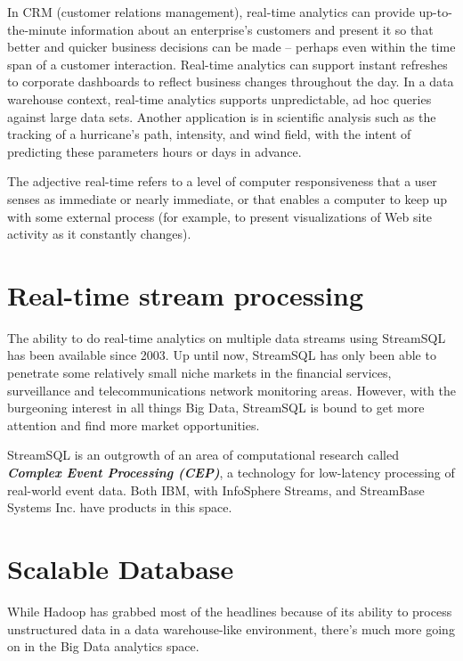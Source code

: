 \documentclass[11pt]{article} %
\begin{document}
In CRM (customer relations management), real-time analytics can provide up-to-the-minute information about an enterprise's customers and present it so that better and quicker business decisions can be made -- perhaps even within the time span of a customer interaction. Real-time analytics can support instant refreshes to corporate dashboards to reflect business changes throughout the day. In a data warehouse context, real-time analytics supports unpredictable, ad hoc queries against large data sets. Another application is in scientific analysis such as the tracking of a hurricane's path, intensity, and wind field, with the intent of predicting these parameters hours or days in advance.


The adjective real-time refers to a level of computer responsiveness that a user senses as immediate or nearly immediate, or that enables a computer to keep up with some external process (for example, to present visualizations of Web site activity as it constantly changes).



\section{Real-time stream processing}


The ability to do real-time analytics on multiple data streams using StreamSQL has been available since 2003. Up until now, StreamSQL has only been able to penetrate some relatively small niche markets in the financial services, surveillance and telecommunications network monitoring areas. However, with the burgeoning interest in all things Big Data, StreamSQL is bound to get more attention and find more market opportunities.



StreamSQL is an outgrowth of an area of computational research called \textbf{\textit{Complex Event Processing (CEP)}}, a technology for low-latency processing of real-world event data. Both IBM, with InfoSphere Streams, and StreamBase Systems Inc. have products in this space.

\newpage

\section{Scalable Database}


While Hadoop has grabbed most of the headlines because of its ability to process unstructured data in a data warehouse-like environment, there’s much more going on in the Big Data analytics space.
\end{document}
